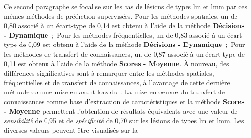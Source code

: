 Ce second paragraphe se focalise sur les cas de lésions de types \gls{lm} et \gls{lmm} par ces mêmes méthodes de prédiction supervisées. Pour les méthodes spatiales, un \fscore{} de 0,80 associé à un écart-type de 0,14 est obtenu à l'aide de la méthode \textbf{Décisions - Dynamique}~;~Pour les méthodes fréquentielles, un \fscore{} de 0,83 associé à un écart-type de 0,09 est obtenu à l'aide de la méthode \textbf{Décisions - Dynamique}~;~Pour les méthodes de transfert de connaissances, un \fscore{} de 0,87 associé à un écart-type de 0,11 est obtenu à l'aide de la méthode \textbf{Scores - Moyenne}. À nouveau, des différences significatives sont à remarquer entre les méthodes spatiales, fréquentielles et de transfert de connaissances, à l'avantage de cette dernière méthode comme mise en avant lors du . La mise en oeuvre du transfert de connaissances comme base d'extraction de caractéristiques et la méthode \textbf{Scores - Moyenne} permettent l'obtention de résultats équivalents avec une valeur de \textit{sensibilité} de 0,95 et de \textit{spécificité} de 0,70 sur les lésions de types \gls{lm} et \gls{lmm}. Les diverses valeurs peuvent être visualisés sur la .\par

